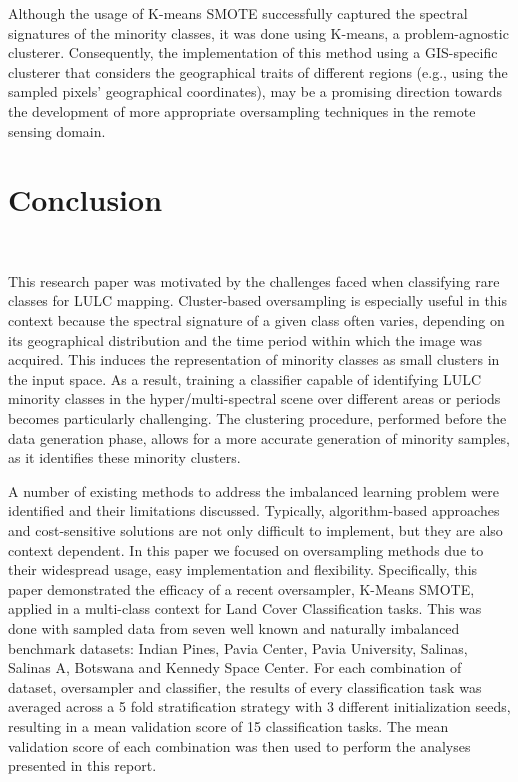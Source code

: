 \documentclass[information,article,submit,moreauthors,pdftex]{Definitions/mdpi}
\begin{document}
\begin{paracol}{2}
Although the usage of K-means SMOTE successfully captured the spectral
signatures of the minority classes, it was done using K-means, a
problem-agnostic clusterer. Consequently, the implementation of this method
using a GIS-specific clusterer that considers the geographical traits of
different regions (e.g., using the sampled pixels' geographical coordinates),
may be a promising direction towards the development of more appropriate
oversampling techniques in the remote sensing domain.

\section{Conclusion}~\label{sec:conclusion} 

This research paper was motivated by the challenges faced when classifying
rare classes for LULC mapping. Cluster-based oversampling is especially useful
in this context because the spectral signature of a given class often varies,
depending on its geographical distribution and the time period within which
the image was acquired. This induces the representation of minority classes as
small clusters in the input space. As a result, training a classifier capable
of identifying LULC minority classes in the hyper/multi-spectral scene over
different areas or periods becomes particularly challenging. The clustering
procedure, performed before the data generation phase, allows for a more
accurate generation of minority samples, as it identifies these minority
clusters.

A number of existing methods to address the imbalanced learning problem were
identified and their limitations discussed. Typically, algorithm-based
approaches and cost-sensitive solutions are not only difficult to implement,
but they are also context dependent. In this paper we focused on oversampling
methods due to their widespread usage, easy implementation and flexibility.
Specifically, this paper demonstrated the efficacy of a recent oversampler,
K-Means SMOTE, applied in a multi-class context for Land Cover Classification
tasks. This was done with sampled data from seven well known and naturally
imbalanced benchmark datasets: Indian Pines, Pavia Center, Pavia University,
Salinas, Salinas A, Botswana and Kennedy Space Center. For each combination of
dataset, oversampler and classifier, the results of every classification task
was averaged across a 5 fold stratification strategy with 3 different
initialization seeds, resulting in a mean validation score of 15
classification tasks. The mean validation score of each combination was then
used to perform the analyses presented in this report.


\end{paracol}
\end{document}
